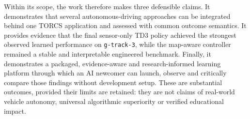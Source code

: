Within its scope, the work therefore makes three defensible claims. It demonstrates that several autonomous-driving approaches can be integrated behind one TORCS application and assessed with common outcome semantics. It provides evidence that the final sensor-only TD3 policy achieved the strongest observed learned performance on \texttt{g-track-3}, while the map-aware controller remained a stable and interpretable engineered benchmark. Finally, it demonstrates a packaged, evidence-aware and research-informed learning platform through which an AI newcomer can launch, observe and critically compare those findings without development setup. These are substantial outcomes, provided their limits are retained: they are not claims of real-world vehicle autonomy, universal algorithmic superiority or verified educational impact.


